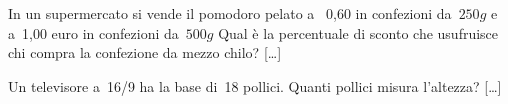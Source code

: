 \begin{multicols}{2}
% 

\begin{esercizio}
\label{ese:3.192}
In un supermercato si vende il pomodoro pelato a \officialeuro\ 0,60 in
confezioni da~\(250\unit{g}\) e a~1,00 euro in confezioni da~\(500\unit{g}\) 
Qual è la percentuale di sconto che usufruisce chi compra la confezione da 
mezzo chilo? \hfill [\dots]
\end{esercizio}


% 

\begin{esercizio}
\label{ese:3.196}
Un televisore a~16/9 ha la base di~18 pollici. Quanti
pollici misura l'altezza? \hfill [\dots]
\end{esercizio}


\end{multicols}
